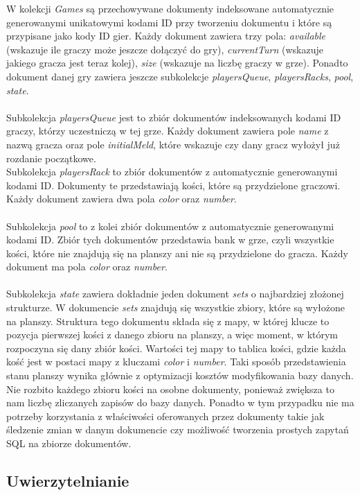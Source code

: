W kolekcji \emph{Games} są przechowywane dokumenty indeksowane automatycznie generowanymi unikatowymi kodami ID przy tworzeniu dokumentu i które są przypisane jako kody ID gier. Każdy dokument zawiera trzy pola: \emph{available} (wskazuje ile graczy może jeszcze dołączyć do gry), \emph{currentTurn} (wskazuje jakiego gracza jest teraz kolej), \emph{size} (wskazuje na liczbę graczy w grze). Ponadto dokument danej gry zawiera jeszcze subkolekcje \emph{playersQueue}, \emph{playersRacks}, \emph{pool}, \emph{state}. \\ \\
Subkolekcja \emph{playersQueue} jest to zbiór dokumentów indeksowanych kodami ID graczy, którzy uczestniczą w tej grze. Każdy dokument zawiera pole \emph{name} z nazwą gracza oraz pole \emph{initialMeld}, które wskazuje czy dany gracz wyłożył już rozdanie początkowe. \\
Subkolekcja \emph{playersRack} to zbiór dokumentów z automatycznie generowanymi kodami ID. Dokumenty te przedstawiają kości, które są przydzielone graczowi. Każdy dokument zawiera dwa pola \emph{color} oraz \emph{number}. \\ \\
Subkolekcja \emph{pool} to z kolei zbiór dokumentów z automatycznie generowanymi kodami ID. Zbiór tych dokumentów przedstawia bank w grze, czyli wszystkie kości, które nie znajdują się na planszy ani nie są przydzielone do gracza. Każdy dokument ma pola \emph{color} oraz \emph{number}. \\ \\
Subkolekcja \emph{state} zawiera dokładnie jeden dokument \emph{sets} o najbardziej złożonej strukturze. W dokumencie \emph{sets} znajdują się wszystkie zbiory, które są wyłożone na planszy. Struktura tego dokumentu składa się z mapy, w której klucze to pozycja pierwszej kości z danego zbioru na planszy, a więc moment, w którym rozpoczyna się dany zbiór kości. Wartości tej mapy to tablica kości, gdzie każda kość jest w postaci mapy z kluczami \emph{color} i \emph{number}. Taki sposób przedstawienia stanu planszy wynika głównie z optymizacji kosztów modyfikowania bazy danych. Nie rozbito każdego zbioru kości na osobne dokumenty, ponieważ zwiększa to nam liczbę zliczanych zapisów do bazy danych. Ponadto w tym przypadku nie ma potrzeby korzystania z właściwości oferowanych przez dokumenty takie jak śledzenie zmian w danym dokumencie czy możliwość tworzenia prostych zapytań SQL na zbiorze dokumentów.

\subsection{Uwierzytelnianie}

